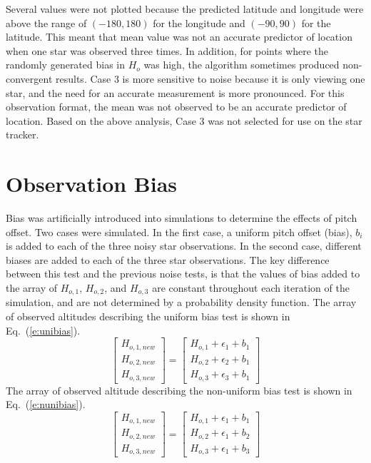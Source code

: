\documentclass[12pt,a4paper]{book}
\begin{document}
Several values were not plotted because the predicted latitude and longitude were above the range of $(-180,180)$ for the longitude and $(-90, 90)$ for the latitude.  This meant that mean value was not an accurate predictor of location when one star was observed three times.  In addition, for points where the randomly generated bias in $H_{o}$ was high, the algorithm sometimes produced non-convergent results.  Case 3 is more sensitive to noise because it is only viewing one star, and the need for an accurate measurement is more pronounced.  For this observation format, the mean was not observed to be an accurate predictor of location.  Based on the above analysis, Case 3 was not selected for use on the star tracker.
\FloatBarrier
\section{Observation Bias}
Bias was artificially introduced into simulations to determine the effects of pitch offset.  Two cases were simulated.  In the first case, a uniform pitch offset (bias), $b_{i}$ is added to each of the three noisy star observations. In the second case, different biases are added to each of the three star observations. The key difference between this test and the previous noise tests, is that the values of bias added to the array of $H_{o,1}$, $H_{o,2}$, and $H_{o,3}$ are constant throughout each iteration of the simulation, and are not determined by a probability density function.  The array of observed altitudes describing the uniform bias test is shown in Eq.~(\ref{e:unibias}).
\begin{equation}
\begin{bmatrix}
H_{o,1,new} \\
H_{o,2,new}\\
H_{o,3,new}
\end{bmatrix} = 
\begin{bmatrix}
H_{o,1} + \epsilon_{1} + b_{1}\\
H_{o,2} + \epsilon_{2} + b_{1}\\
H_{o,3} + \epsilon_{3} + b_{1}
\end{bmatrix}
\label{e:unibias}
\end{equation}
The array of observed altitude describing the non-uniform bias test is shown in Eq.~(\ref{e:nunibias}).
\begin{equation}
\begin{bmatrix}
H_{o,1,new} \\
H_{o,2,new}\\
H_{o,3,new}
\end{bmatrix} = 
\begin{bmatrix}
H_{o,1} + \epsilon_{1} + b_{1}\\
H_{o,2} + \epsilon_{1} + b_{2}\\
H_{o,3} + \epsilon_{1} + b_{3}
\end{bmatrix}
\label{e:nunibias}
\end{equation}
\end{document}
